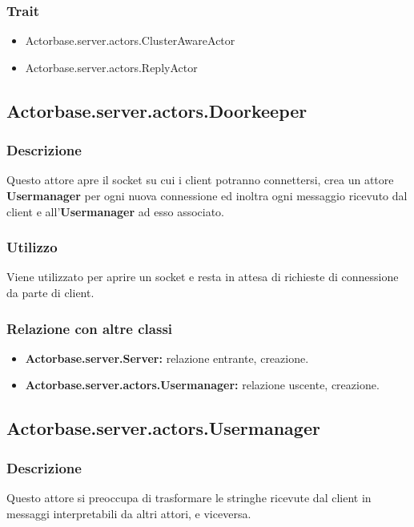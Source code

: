 \documentclass[a4paper]{article}
\begin{document}
			\subsubsection{Trait}
				\begin{itemize}
					\item Actorbase.server.actors.ClusterAwareActor
					\item Actorbase.server.actors.ReplyActor
				\end{itemize}
		
		\subsection{Actorbase.server.actors.Doorkeeper}
			\subsubsection{Descrizione}
				Questo attore apre il socket su cui i client potranno connettersi, crea un attore \textbf{Usermanager} per ogni nuova 
				connessione ed inoltra ogni messaggio ricevuto dal client e  all'\textbf{Usermanager} ad esso associato.
				
			\subsubsection{Utilizzo}
				Viene utilizzato per aprire un socket e resta in attesa di richieste di connessione da parte di client.
				
			\subsubsection{Relazione con altre classi}
				\begin{itemize}
					\item \textbf{Actorbase.server.Server:} relazione entrante, creazione.
					\item \textbf{Actorbase.server.actors.Usermanager:} relazione uscente, creazione.
				\end{itemize}
				
		\subsection{Actorbase.server.actors.Usermanager}
			\subsubsection{Descrizione}
				Questo attore si preoccupa di trasformare le stringhe ricevute dal client in messaggi interpretabili da altri attori, e viceversa.
				
\end{document}
